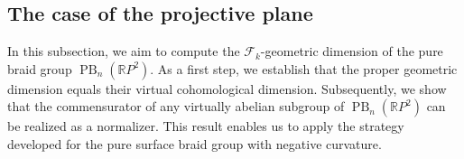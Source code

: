 \documentclass[a4paper,12pt,leqno]{amsart}
\theoremstyle{definition}
\newtheorem{remark}{Remark}
\newcommand{\calF}{{\mathcal F}}
\DeclareMathOperator{\vcd}{vcd}
\DeclareMathOperator{\gd}{gd}
\DeclareMathOperator{\mcg}{Mod}
\DeclareMathOperator{\pb}{PB}
\begin{document}
\subsection{The case of the projective plane}





In this subsection, we aim to compute the $\calF_k$-geometric dimension of the pure braid group $\pb_n(\mathbb{R}P^2)$. 
As a first step, we establish that the proper geometric dimension equals their virtual cohomological dimension. 
Subsequently, we show that the commensurator of any virtually abelian subgroup of $\pb_n(\mathbb{R}P^2)$ can be realized as a normalizer. 
This result enables us to apply the strategy developed for the pure surface braid group with negative curvature.
\end{document}
